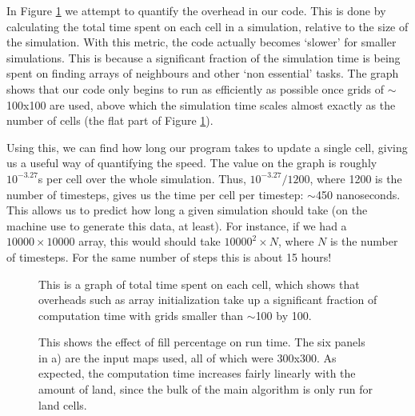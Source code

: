 	 In Figure \ref{overhead} we attempt to quantify the overhead in our code. This is done by calculating the total time spent on each cell in a 
	 simulation, relative to the size of the simulation. With this metric, the code actually becomes `slower' for smaller simulations. This is 
	 because a significant fraction of the simulation time is being spent on finding arrays of neighbours and other `non essential' tasks. The graph
	 shows that our code only begins to run as efficiently as possible once grids of $\sim$100x100 are used, above which the simulation time scales
	 almost exactly as the number of cells (the flat part of Figure \ref{overhead}).\newline{}

	 
	 Using this, we can find how long our program takes to update a single cell, giving us a useful way of quantifying the speed. The value on the 
	 graph is roughly $10^{-3.27}$s per cell over the whole simulation. Thus, $10^{-3.27}/1200$, where 1200 is the number of timesteps, gives us the 
	 time per cell per timestep: $\sim$450 nanoseconds. This allows us to predict how long a given simulation should take (on the machine use to
	 generate this data, at least). For instance, if we had a $10000\times10000$ array, this would should take $10000^{2}\times N$, where $N$ is the 
	 number of timesteps. For the same number of steps this is about 15 hours!
	 
	 \newpage{}
	 
  \begin{figure}[H]
  \begin{center}
  
  \caption{\label{overhead}This is a graph of total time spent on each cell, which shows that overheads such as array initialization
  take up a significant fraction of computation time with grids smaller than $\sim$100 by 100.}
  \end{center}
  \end{figure}
  
  
  \begin{figure}[H]
  \begin{center}
  \subfloat[]{}
  \caption{\label{empty}This shows the effect of fill percentage on run time. The six panels in a) are the input maps used, all of which were
  300x300. As expected, the computation time increases fairly linearly with
  the amount of land, since the bulk of the main algorithm is only run for land cells.}
  \end{center}
  \end{figure}
  
